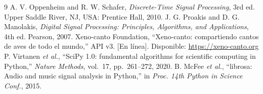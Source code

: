 \documentclass[conference]{IEEEtran}
\begin{document}
\begin{thebibliography}{9}
 A. V. Oppenheim and R. W. Schafer, \emph{Discrete-Time Signal
Processing}, 3rd ed. Upper Saddle River, NJ, USA: Prentice Hall, 2010.
 J. G. Proakis and D. G. Manolakis, \emph{Digital Signal
Processing: Principles, Algorithms, and Applications}, 4th ed. Pearson, 2007.
 Xeno-canto Foundation, ``Xeno-canto: compartiendo cantos de
aves de todo el mundo,'' API v3. [En línea]. Disponible:
\url{https://xeno-canto.org}
 P. Virtanen \textit{et al.}, ``SciPy 1.0: fundamental algorithms
for scientific computing in Python,'' \emph{Nature Methods}, vol.~17,
pp.~261--272, 2020.
 B. McFee \textit{et al.}, ``librosa: Audio and music signal
analysis in Python,'' in \emph{Proc. 14th Python in Science Conf.}, 2015.
\end{thebibliography}
\end{document}
